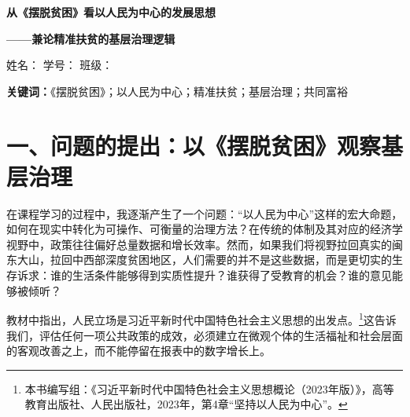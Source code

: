 \documentclass[12pt,a4paper]{ctexart}
\begin{document}
\begin{center}
    {\bfseries 从《摆脱贫困》看以人民为中心的发展思想\par}
    \vspace{0.5em}
    {\bfseries ——兼论精准扶贫的基层治理逻辑\par}
    \vspace{1.2em}
    {
    姓名：\underline{} \qquad
    学号：\underline{} \qquad
    班级：\underline{}\par}
    \vspace{1.0em}
\end{center}

\begin{abstract}
《摆脱贫困》记录了闽东地区走出贫困的过程，这本书也是理解中国特色社会主义现代化基层治理的生动样本。它并非单纯陈述宏大叙事，而是由群众路线出发，落实到干部作风建设，并进一步延伸到地方产业选择，将价值立场、组织作风与发展路径编织在一起。基于本门课程的教学内容，本文从“以人民为中心”在基层治理中的具体展开入手，分析《摆脱贫困》中的基层治理逻辑。
本文认为：中国的脱贫成就并不在于简单的资源投入，而在于形成了一套系统化的治理机制，能够回应群众真实需求、调动群众主体力量，并在干部与群众之间形成良性互动。
\end{abstract}

\noindent \textbf{关键词：}《摆脱贫困》；以人民为中心；精准扶贫；基层治理；共同富裕

\vspace{1.5em}

\section*{一、问题的提出：以《摆脱贫困》观察基层治理}

在课程学习的过程中，我逐渐产生了一个问题：“以人民为中心”这样的宏大命题，如何在现实中转化为可操作、可衡量的治理方法？在传统的体制及其对应的经济学视野中，政策往往偏好总量数据和增长效率。然而，如果我们将视野拉回真实的闽东大山，拉回中西部深度贫困地区，人们需要的并不是这些数据，而是更切实的生存诉求：谁的生活条件能够得到实质性提升？谁获得了受教育的机会？谁的意见能够被倾听？

教材中指出，人民立场是习近平新时代中国特色社会主义思想的出发点。\footnote{本书编写组：《习近平新时代中国特色社会主义思想概论（2023年版）》，高等教育出版社、人民出版社，2023年，第4章“坚持以人民为中心”。}这告诉我们，评估任何一项公共政策的成效，必须建立在微观个体的生活福祉和社会层面的客观改善之上，而不能停留在报表中的数字增长上。
\end{document}
